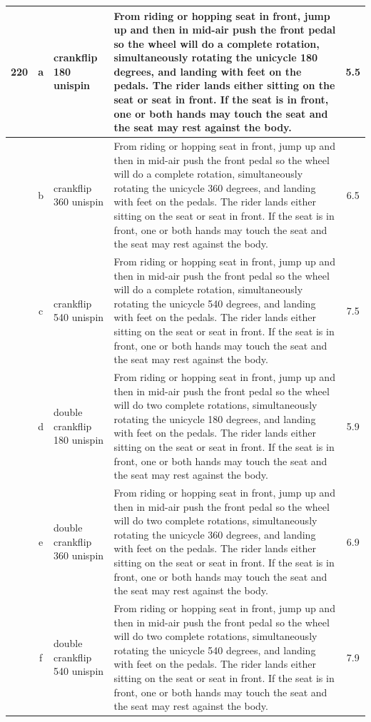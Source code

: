 \begin{longtable}{|r|c|p{4cm}|p{8cm}|c|}
\hline
220 & a & crankflip 180 unispin & From riding or hopping seat in front, jump up and then in mid-air push the front pedal so the wheel will do a complete rotation, simultaneously rotating the unicycle 180 degrees, and landing with feet on the pedals. The rider lands either sitting on the seat or seat in front. If the seat is in front, one or both hands may touch the seat and the seat may rest against the body.  & 5.5 \\ 
\hline
  & b & crankflip 360 unispin & From riding or hopping seat in front, jump up and then in mid-air push the front pedal so the wheel will do a complete rotation, simultaneously rotating the unicycle 360 degrees, and landing with feet on the pedals. The rider lands either sitting on the seat or seat in front. If the seat is in front, one or both hands may touch the seat and the seat may rest against the body.  & 6.5 \\ 
\hline
  & c & crankflip 540 unispin & From riding or hopping seat in front, jump up and then in mid-air push the front pedal so the wheel will do a complete rotation, simultaneously rotating the unicycle 540 degrees, and landing with feet on the pedals. The rider lands either sitting on the seat or seat in front. If the seat is in front, one or both hands may touch the seat and the seat may rest against the body.  & 7.5 \\ 
\hline
  & d & double crankflip 180 unispin  & From riding or hopping seat in front, jump up and then in mid-air push the front pedal so the wheel will do two complete rotations, simultaneously rotating the unicycle 180 degrees, and landing with feet on the pedals. The rider lands either sitting on the seat or seat in front. If the seat is in front, one or both hands may touch the seat and the seat may rest against the body. & 5.9 \\ 
\hline
  & e & double crankflip 360 unispin  & From riding or hopping seat in front, jump up and then in mid-air push the front pedal so the wheel will do two complete rotations, simultaneously rotating the unicycle 360 degrees, and landing with feet on the pedals. The rider lands either sitting on the seat or seat in front. If the seat is in front, one or both hands may touch the seat and the seat may rest against the body. & 6.9 \\ 
\hline
  & f & double crankflip 540 unispin  & From riding or hopping seat in front, jump up and then in mid-air push the front pedal so the wheel will do two complete rotations, simultaneously rotating the unicycle 540 degrees, and landing with feet on the pedals. The rider lands either sitting on the seat or seat in front. If the seat is in front, one or both hands may touch the seat and the seat may rest against the body. & 7.9 \\ 

\end{longtable}
